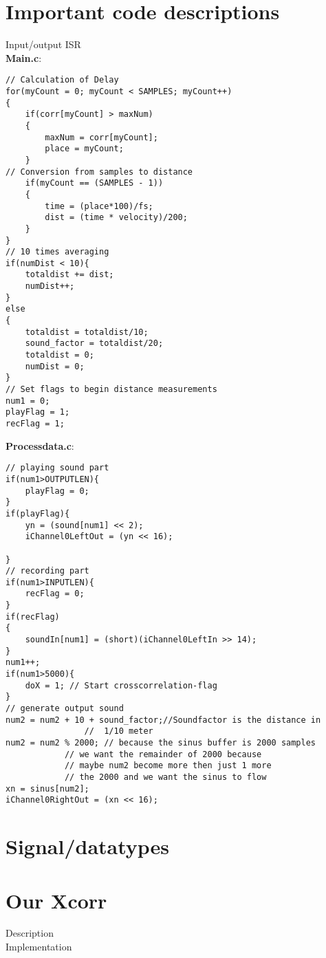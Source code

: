 \section{Important code descriptions}
Input/output ISR\\
\textbf{Main.c}:\\
\begin{lstlisting}
// Calculation of Delay
for(myCount = 0; myCount < SAMPLES; myCount++)
{
	if(corr[myCount] > maxNum)
	{
		maxNum = corr[myCount];
		place = myCount;	
	}
// Conversion from samples to distance
	if(myCount == (SAMPLES - 1))
	{
		time = (place*100)/fs;
		dist = (time * velocity)/200;
	}
}
// 10 times averaging
if(numDist < 10){
	totaldist += dist;
	numDist++;
}
else
{
	totaldist = totaldist/10;
	sound_factor = totaldist/20;
	totaldist = 0;
	numDist = 0;
}
// Set flags to begin distance measurements
num1 = 0;
playFlag = 1;
recFlag = 1;
\end{lstlisting}


\textbf{Processdata.c}:\\
\begin{lstlisting}
// playing sound part
if(num1>OUTPUTLEN){
	playFlag = 0;
}
if(playFlag){
	yn = (sound[num1] << 2);
	iChannel0LeftOut = (yn << 16);
		
}
// recording part
if(num1>INPUTLEN){
	recFlag = 0;
}
if(recFlag)
{
	soundIn[num1] = (short)(iChannel0LeftIn >> 14);
}
num1++;
if(num1>5000){
	doX = 1; // Start crosscorrelation-flag
}
// generate output sound
num2 = num2 + 10 + sound_factor;//Soundfactor is the distance in 
				//  1/10 meter
num2 = num2 % 2000;	// because the sinus buffer is 2000 samples
			// we want the remainder of 2000 because 
			// maybe num2 become more then just 1 more 
			// the 2000 and we want the sinus to flow
xn = sinus[num2];			
iChannel0RightOut = (xn << 16);
\end{lstlisting}
\section{Signal/datatypes}
\section{Our Xcorr}
Description\\
Implementation\\